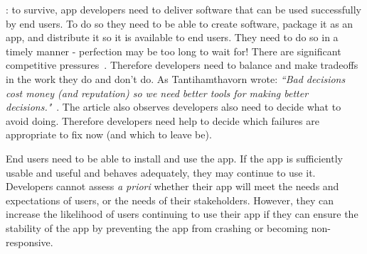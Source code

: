: to survive, app developers need to deliver software that can be used successfully by end users. To do so they need to be able to create software, package it as an app, and distribute it so it is available to end users.
%
They need to do so in a timely manner - perfection may be too long to wait for! There are significant competitive pressures~. Therefore developers need to balance and make tradeoffs in the work they do and don't do. As Tantihamthavorn wrote: \emph{``Bad decisions cost money (and reputation) so we need better tools for making better decisions."}~. The article also observes developers also need to decide what to avoid doing. Therefore developers need help to decide which failures are appropriate to fix now (and which to leave be).

End users need to be able to install and use the app. If the app is sufficiently usable and useful and behaves adequately, they may continue to use it. Developers cannot assess \emph{a priori} whether their app will meet the needs and expectations of users, or the needs of their stakeholders. However, they can increase the likelihood of users continuing to use their app if they can ensure the stability of the app by preventing the app from crashing or becoming non-responsive. 

